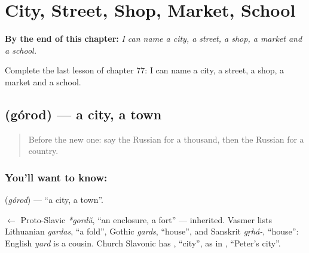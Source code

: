 
\chapter{City, Street, Shop, Market, School}
\label{ch:ru-city-street-shop-market-school}

\begin{chapteropening}
\textbf{By the end of this chapter:} \emph{I can name a city, a street, a shop, a market and a school.}

Complete the last lesson of chapter 77: I can name a city, a street, a shop, a market and a school.
\end{chapteropening}

\section[\texorpdfstring{\ru{город} (górod)}{город (górod)}]{ (górod) — a city, a town}

\label{lesson:RU-C77-city}



\begin{quote}
Before the new one: say the Russian for a thousand, then the Russian for a country.
\end{quote}

\subsection*{You'll want to know: }
\textbf{} (\emph{górod}) — \textquotedblleft{}a city, a town\textquotedblright{}.

\begin{cousinweb}
\textbf{} $\leftarrow$ Proto-Slavic \emph{*gordŭ}, \textquotedblleft{}an enclosure, a fort\textquotedblright{} — inherited. Vasmer lists Lithuanian \emph{gardas}, \textquotedblleft{}a fold\textquotedblright{}, Gothic \emph{gards}, \textquotedblleft{}house\textquotedblright{}, and Sanskrit \emph{gṛhá-}, \textquotedblleft{}house\textquotedblright{}: English \emph{yard} is a cousin. Church Slavonic has \emph{}, \textquotedblleft{}city\textquotedblright{}, as in , \textquotedblleft{}Peter's city\textquotedblright{}.
\end{cousinweb}

